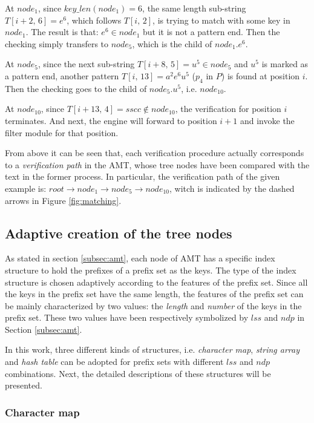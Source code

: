 \documentclass{article}
\begin{document}
At $node_1$, since $key\_len(node_1)=6$, the same length sub-string
$T[i+2,\,6]=e^6$, which follows $T[i,\,2]$, is trying to match with
some key in $node_1$. The result is that: $e^6 \in node_1$ but it is
not a pattern end. Then the checking simply transfers to $node_5$,
which is the child of $node_1.e^6$.

At $node_5$, since the next sub-string $T[i+8,\,5]=u^5 \in node_5$ and
$u^5$ is marked as a pattern end, another pattern
$T[i,\,13]=a^2e^6u^5$ ($p_4$ in $P$) is found at position $i$. Then
the checking goes to the child of $node_5.u^5$, i.e.  $node_{10}$.

At $node_{10}$, since $T[i+13,\,4]=sscc \notin node_{10}$, the
verification for position $i$ terminates. And next, the engine will
forward to position $i+1$ and invoke the filter module for that
position.

From above it can be seen that, each verification procedure actually
corresponds to a \emph{verification path} in the AMT, whose tree nodes
have been compared with the text in the former process. In particular,
the verification path of the given example is:
$root \rightarrow node_1 \rightarrow node_5 \rightarrow node_{10}$,
witch is indicated by the dashed arrows in Figure \ref{fig:matching}.


\subsection{Adaptive creation of the tree nodes}
\label{subsec:nodes}

As stated in section \ref{subsec:amt}, each node of AMT has a specific
index structure to hold the prefixes of a prefix set as the keys. The
type of the index structure is chosen adaptively according to the
features of the prefix set. Since all the keys in the prefix set have
the same length, the features of the prefix set can be mainly
characterized by two values: the \emph{length} and \emph{number} of
the keys in the prefix set. These two values have been respectively
symbolized by $lss$ and $ndp$ in Section \ref{subsec:amt}.

In this work, three different kinds of structures,
i.e. \emph{character map}, \emph{string array} and \emph{hash table}
can be adopted for prefix sets with different $lss$ and $ndp$
combinations. Next, the detailed descriptions of these structures will
be presented.

\subsubsection{Character map}
\end{document}
